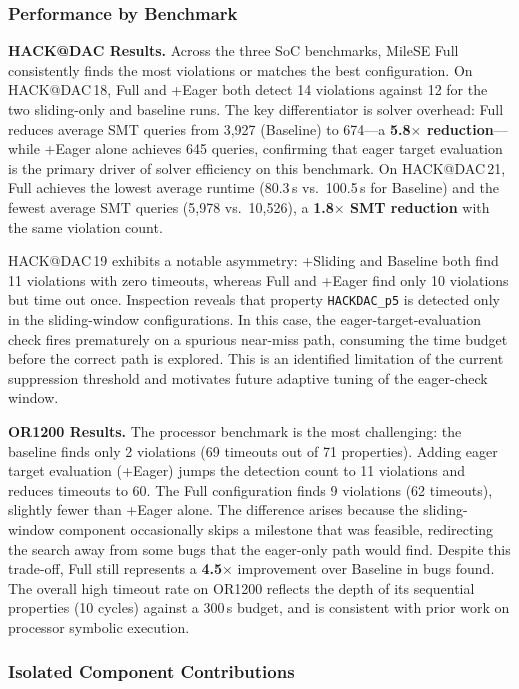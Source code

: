\documentclass[conference]{IEEEtran}
\begin{document}
\subsubsection{Performance by Benchmark}

\textbf{HACK@DAC Results.}
Across the three SoC benchmarks, MileSE Full consistently finds the most violations or matches the best configuration. On HACK@DAC\,18, Full and +Eager both detect 14 violations against 12 for the two sliding-only and baseline runs. The key differentiator is solver overhead: Full reduces average SMT queries from 3,927 (Baseline) to 674—a \textbf{5.8$\times$ reduction}—while +Eager alone achieves 645 queries, confirming that eager target evaluation is the primary driver of solver efficiency on this benchmark. On HACK@DAC\,21, Full achieves the lowest average runtime (80.3\,s vs.\ 100.5\,s for Baseline) and the fewest average SMT queries (5,978 vs.\ 10,526), a \textbf{1.8$\times$ SMT reduction} with the same violation count.

HACK@DAC\,19 exhibits a notable asymmetry: +Sliding and Baseline both find 11 violations with zero timeouts, whereas Full and +Eager find only 10 violations but time out once. Inspection reveals that property \texttt{HACKDAC\_p5} is detected only in the sliding-window configurations. In this case, the eager-target-evaluation check fires prematurely on a spurious near-miss path, consuming the time budget before the correct path is explored. This is an identified limitation of the current suppression threshold and motivates future adaptive tuning of the eager-check window.

\textbf{OR1200 Results.}
The processor benchmark is the most challenging: the baseline finds only 2 violations (69 timeouts out of 71 properties). Adding eager target evaluation (+Eager) jumps the detection count to 11 violations and reduces timeouts to 60. The Full configuration finds 9 violations (62 timeouts), slightly fewer than +Eager alone. The difference arises because the sliding-window component occasionally skips a milestone that was feasible, redirecting the search away from some bugs that the eager-only path would find. Despite this trade-off, Full still represents a \textbf{4.5$\times$} improvement over Baseline in bugs found. The overall high timeout rate on OR1200 reflects the depth of its sequential properties (10 cycles) against a 300\,s budget, and is consistent with prior work on processor symbolic execution.

\subsubsection{Isolated Component Contributions}
\end{document}
